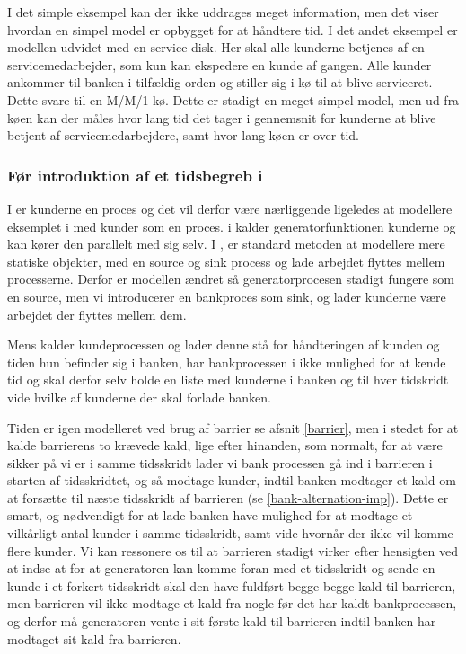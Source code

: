 I det simple eksempel kan der ikke uddrages meget information, men det viser hvordan en simpel model er opbygget for at håndtere tid.
I det andet eksempel er modellen 
udvidet med en service disk. Her skal alle kunderne betjenes af en 
servicemedarbejder, som kun kan ekspedere en kunde af gangen. Alle kunder ankommer til banken i tilfældig orden og 
stiller sig i kø til at blive serviceret. Dette  svare til en M/M/1 kø. Dette er stadigt en meget simpel model, men ud fra køen kan der måles hvor lang tid det tager i gennemsnit for kunderne at blive betjent af servicemedarbejdere, samt hvor lang køen er over tid. 

\subsubsection{Før introduktion af et tidsbegreb i \pycsp}
I \simpy er kunderne en proces og det vil derfor være nærliggende ligeledes at 
modellere eksemplet i \pycsp med kunder som en proces. i \simpy kalder 
generatorfunktionen kunderne og kan kører den parallelt med sig selv. 
I \pycsp{}, er standard metoden at modellere mere statiske objekter, med en source og sink 
process og lade arbejdet flyttes mellem processerne. Derfor er modellen ændret 
så  generatorprocesen stadigt fungere som en source, men vi introducerer en 
bankproces som sink, og lader kunderne være arbejdet der flyttes mellem dem. 

Mens \simpy  kalder kundeprocessen og lader denne stå for håndteringen af 
kunden og tiden hun befinder sig i banken, har bankprocessen i \pycsp ikke 
mulighed for at kende tid og skal derfor selv holde en liste med kunderne 
i banken og  til hver tidskridt vide hvilke af kunderne der skal forlade 
banken. 

Tiden er igen modelleret ved brug af barrier se afsnit \vref{barrier}, men 
i stedet for  at kalde barrierens to krævede kald, lige efter hinanden, som 
normalt, for at være sikker på vi er i samme tidsskridt lader vi bank
processen gå ind i barrieren i starten af tidsskridtet, og så modtage kunder, 
indtil banken modtager et kald om at forsætte til næste tidsskridt af 
barrieren (se \autoref{bank-alternation-imp}). Dette er smart, og nødvendigt for at lade banken have mulighed for at modtage 
et vilkårligt antal kunder i samme tidsskridt, samt vide hvornår der ikke vil  
komme flere kunder. Vi kan ressonere os til at barrieren stadigt virker efter 
hensigten ved at indse at for at generatoren kan komme foran med et tidsskridt og sende en 
kunde i et forkert tidsskridt skal den have fuldført begge begge kald til barrieren, men 
barrieren vil ikke modtage et kald fra nogle før det har kaldt bankprocessen, 
og derfor må generatoren vente i sit første kald til barrieren indtil banken har 
modtaget sit kald fra barrieren. 

